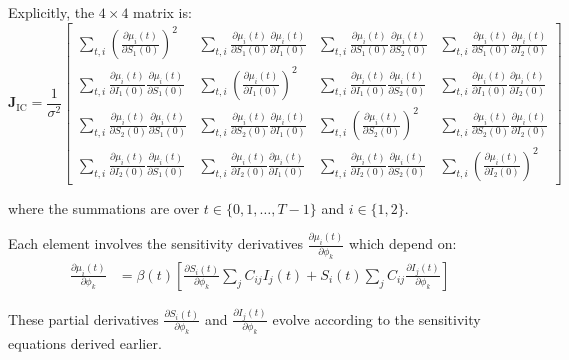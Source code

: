 Explicitly, the $4 \times 4$ matrix is:
\begin{equation}
\mathbf{J}_{\text{IC}} = \frac{1}{\sigma^2} \begin{bmatrix}
\sum_{t,i} \left(\frac{\partial \mu_i(t)}{\partial S_1(0)}\right)^2 & \sum_{t,i} \frac{\partial \mu_i(t)}{\partial S_1(0)} \frac{\partial \mu_i(t)}{\partial I_1(0)} & \sum_{t,i} \frac{\partial \mu_i(t)}{\partial S_1(0)} \frac{\partial \mu_i(t)}{\partial S_2(0)} & \sum_{t,i} \frac{\partial \mu_i(t)}{\partial S_1(0)} \frac{\partial \mu_i(t)}{\partial I_2(0)} \\
\sum_{t,i} \frac{\partial \mu_i(t)}{\partial I_1(0)} \frac{\partial \mu_i(t)}{\partial S_1(0)} & \sum_{t,i} \left(\frac{\partial \mu_i(t)}{\partial I_1(0)}\right)^2 & \sum_{t,i} \frac{\partial \mu_i(t)}{\partial I_1(0)} \frac{\partial \mu_i(t)}{\partial S_2(0)} & \sum_{t,i} \frac{\partial \mu_i(t)}{\partial I_1(0)} \frac{\partial \mu_i(t)}{\partial I_2(0)} \\
\sum_{t,i} \frac{\partial \mu_i(t)}{\partial S_2(0)} \frac{\partial \mu_i(t)}{\partial S_1(0)} & \sum_{t,i} \frac{\partial \mu_i(t)}{\partial S_2(0)} \frac{\partial \mu_i(t)}{\partial I_1(0)} & \sum_{t,i} \left(\frac{\partial \mu_i(t)}{\partial S_2(0)}\right)^2 & \sum_{t,i} \frac{\partial \mu_i(t)}{\partial S_2(0)} \frac{\partial \mu_i(t)}{\partial I_2(0)} \\
\sum_{t,i} \frac{\partial \mu_i(t)}{\partial I_2(0)} \frac{\partial \mu_i(t)}{\partial S_1(0)} & \sum_{t,i} \frac{\partial \mu_i(t)}{\partial I_2(0)} \frac{\partial \mu_i(t)}{\partial I_1(0)} & \sum_{t,i} \frac{\partial \mu_i(t)}{\partial I_2(0)} \frac{\partial \mu_i(t)}{\partial S_2(0)} & \sum_{t,i} \left(\frac{\partial \mu_i(t)}{\partial I_2(0)}\right)^2
\end{bmatrix}
\end{equation}

where the summations are over $t \in \{0,1,\ldots,T-1\}$ and $i \in \{1,2\}$.

Each element involves the sensitivity derivatives $\frac{\partial \mu_i(t)}{\partial \phi_k}$ which depend on:
\begin{align}
\frac{\partial \mu_i(t)}{\partial \phi_k} &= \beta(t) \left[ \frac{\partial S_i(t)}{\partial \phi_k} \sum_j C_{ij} I_j(t) + S_i(t) \sum_j C_{ij} \frac{\partial I_j(t)}{\partial \phi_k} \right]
\end{align}

These partial derivatives $\frac{\partial S_i(t)}{\partial \phi_k}$ and $\frac{\partial I_j(t)}{\partial \phi_k}$ evolve according to the sensitivity equations derived earlier.

